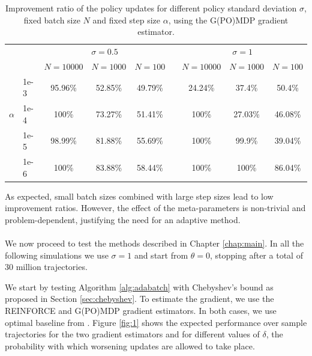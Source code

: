 \begin{table}[H]\label{tab:1}
\caption{Improvement ratio of the policy updates for different policy standard deviation $\sigma$, fixed batch size $N$ and fixed step size $\alpha$, using the G(PO)MDP gradient estimator.}
\centering
\begin{adjustbox}{right}
\begin{tabular}{@{}llccccccc@{}} 
\toprule
\phantom{abc} & \phantom{abc} & \multicolumn{3}{c}{$\sigma=0.5$} & \phantom{abc} & \multicolumn{3}{c}{$\sigma=1$} \\
\cmidrule{3-5} \cmidrule{7-9}
\phantom{abc} & \phantom{abc} & $N=10000$ & $N=1000$ & $N=100$ & \phantom{abc} & $N=10000$ & $N=1000$ & $N=100$
\\\cmidrule{3-9}
\phantom{abc} & 1e-3 & 95.96\% & 52.85\% & 49.79\% & \phantom{abc} & 24.24\% & 37.4\% & 50.4\% \\ 
 $\alpha$	  & 1e-4 & 100\% & 73.27\% & 51.41\% & \phantom{abc} & 100\% & 27.03\% & 46.08\% \\
\phantom{abc} & 1e-5 & 98.99\% & 81.88\% & 55.69\% & \phantom{abc} & 100\% & 99.9\% & 39.04\%\\
\phantom{abc} & 1e-6 & 100\% & 83.88\% & 58.44\% & \phantom{abc} & 100\% & 100\% & 86.04\% \\
\bottomrule
\end{tabular}
\end{adjustbox}
\end{table}

As expected, small batch sizes combined with large step sizes lead to low improvement ratios. However, the effect of the meta-parameters is non-trivial and problem-dependent, justifying the need for an adaptive method.  
\paragraph{}
We now proceed to test the methods described in Chapter \ref{chap:main}. 
In all the following simulations we use $\sigma = 1$ and start from $\theta=0$, stopping after a total of 30 million trajectories.

We start by testing Algorithm \ref{alg:adabatch} with Chebyshev's bound as proposed in Section \ref{sec:chebyshev}. To estimate the gradient, we use the REINFORCE and G(PO)MDP gradient estimators. In both cases, we use optimal baseline from \cite{4867}.
Figure \ref{fig:1} shows the expected performance over sample trajectories for the two gradient estimators and for different values of $\delta$, the probability with which worsening updates are allowed to take place.

